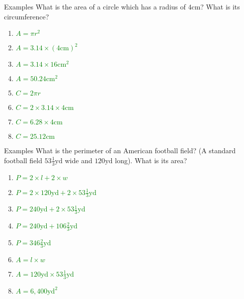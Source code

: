 \documentclass{beamer}
\begin{document}
\begin{frame}{Examples}
    What is the area of a circle which has a radius of
        $4\mathrm{cm}$? What is its circumference?
        \begin{enumerate}[<+(1)->]
            \item \textcolor{green}{$A=\pi r^2$}
            \item \textcolor{green}{$A=3.14 \times (4\mathrm{cm})^2$}
            \item \textcolor{green}{$A=3.14 \times 16\mathrm{cm^2}$}
            \item \textcolor{green}{$A=50.24\mathrm{cm^2}$}
            \item \textcolor{green}{$C=2\pi r$}
            \item \textcolor{green}{$C=2 \times 3.14 \times 4\mathrm{cm}$}
            \item \textcolor{green}{$C=6.28 \times 4\mathrm{cm}$}
            \item \textcolor{green}{$C=25.12\mathrm{cm}$}
        \end{enumerate}
\end{frame}

\begin{frame}{Examples}
    What is the perimeter of an American football field?  (A
        standard football field $53\frac{1}{3}\mathrm{yd}$ wide and $120
        \mathrm{yd}$ long).  What is its area?
    \begin{enumerate}[<+(1)->]
        \item \textcolor{green}{$P=2\times l + 2\times w$}
        \item \textcolor{green}{$P=2 \times 120\mathrm{yd} + 2 \times 53\frac{1}{3}\mathrm{yd}$}
        \item \textcolor{green}{$P=240\mathrm{yd} + 2 \times 53\frac{1}{3}\mathrm{yd}$}
        \item \textcolor{green}{$P=240\mathrm{yd} + 106\frac{2}{3}\mathrm{yd}$}
        \item \textcolor{green}{$P=346\frac{2}{3}\mathrm{yd}$}
        \item \textcolor{green}{$A=l \times w$}
        \item \textcolor{green}{$A=120\mathrm{yd} \times 53\frac{1}{3}\mathrm{yd}$}
        \item \textcolor{green}{$A=6,400\mathrm{yd^2}$}
    \end{enumerate}
\end{frame}
\end{document}
